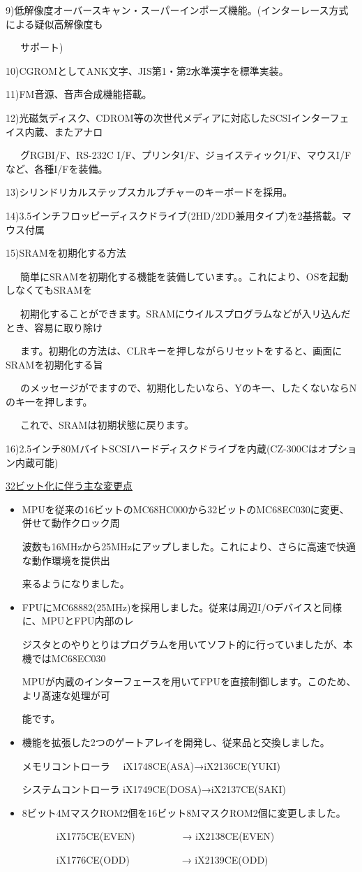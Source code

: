 ﻿\documentclass[twoside,a4paper,12pt]{article}
\begin{document}
9)低解像度オーバースキャン・スーパーインポーズ機能。(インターレース方式による疑似高解像度も

\ \ \ サポート)

10)CGROMとしてANK文字、JIS第1・第2水準漢字を標準実装。

11)FM音源、音声合成機能搭載。

12)光磁気ディスク、CDROM等の次世代メディアに対応したSCSIインターフェイス内蔵、またアナロ

\ \ \ グRGBI/F、RS-232C I/F、プリンタI/F、ジョイスティックI/F、マウスI/Fなど、各種I/Fを装備。

13)シリンドリカルステップスカルプチャーのキーボードを採用。

14)3.5インチフロッピーディスクドライブ(2HD/2DD兼用タイプ)を2基搭載。マウス付属

15)SRAMを初期化する方法

\ \ \ 簡単にSRAMを初期化する機能を装備しています。。これにより、OSを起動しなくてもSRAMを

\ \ \ 初期化することができます。SRAMにウイルスプログラムなどが入リ込んだとき、容易に取り除け

\ \ \ ます。初期化の方法は、CLRキーを押しながらリセットをすると、画面にSRAMを初期化する旨

\ \ \ のメッセージがでますので、初期化したいなら、Yのキ一、したくないならNのキ一を押します。

\ \ \ これで、SRAMは初期状態に戻ります。

16)2.5インチ80MバイトSCSIハードディスクドライブを内蔵(CZ-300Cはオプション内蔵可能)

\newpage

\normalsize\uline{32ビット化に伴う主な変更点}

\renewcommand{\labelitemi}{\scriptsize●}
\small
\begin{itemize}[leftmargin=25mm, itemsep=-1mm, topsep=1mm]
\item
MPUを従来の16ビットのMC68HC000から32ビットのMC68EC030に変更、併せて動作クロック周

波数も16MHzから25MHzにアップしました。これにより、さらに高速で快適な動作環境を提供出

来るようになりました。
\item
FPUにMC68882(25MHz)を採用しました。従来は周辺I/Oデバイスと同様に、MPUとFPU内部のレ

ジスタとのやりとりはプログラムを用いてソフト的に行っていましたが、本機ではMC68EC030

MPUが内蔵のインターフェースを用いてFPUを直接制御します。このため、よリ髙速な処理が可

能です。
\item
機能を拡張した2つのゲートアレイを開発し、従来品と交換しました。

メモリコントローラ \ \ iX1748CE(ASA)→iX2136CE(YUKI)

システムコントローラ iX1749CE(DOSA)→iX2137CE(SAKI)
\item
8ビット4MマスクROM2個を16ビット8MマスクROM2個に変更しました。

\ \ \ \ \ \ \ iX1775CE(EVEN) \ \ \ \ \ \ \ \ \ → iX2138CE(EVEN)

\ \ \ \ \ \ \ iX1776CE(ODD) \ \ \ \ \ \ \ \ \ \ → iX2139CE(ODD)
\end{itemize}
\end{document}

